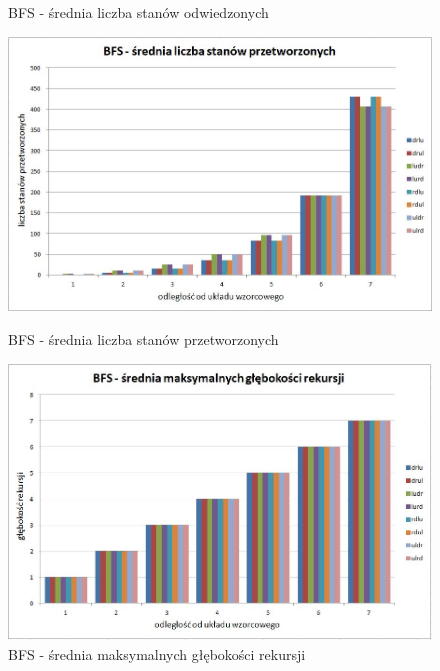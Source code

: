 \documentclass{classrep}
\begin{document}
{\begin{figure}[ht!]
\begin{center}
		\caption{BFS - średnia liczba stanów odwiedzonych}
	\end{center}
\end{figure}
\newpage
\begin{figure}[ht!]
	\begin{center}
		\vspace{0.3in}
		\includegraphics[scale=0.6]{bfs3}
		\caption{BFS - średnia liczba stanów przetworzonych}
		\vspace{0.5in}
		\includegraphics[scale=0.6]{bfs4}
		\caption{BFS - średnia maksymalnych głębokości rekursji}
	\end{center}
\end{figure}
\newpage
\begin{figure}[ht!]
	\begin{center}
		\vspace{0.3in}

\end{center}
\end{figure}}
\end{document}

